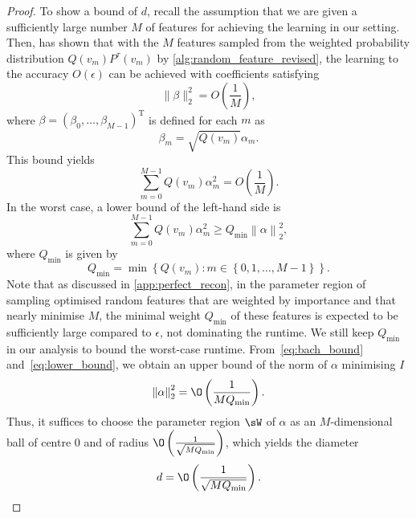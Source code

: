 \begin{proof}
To show a bound of $d$,
recall the assumption that we are given a sufficiently large number $M$ of features for achieving the learning in our setting.
Then, \cite{B1} has shown that
with the $M$ features sampled from the weighted probability distribution $Q(v_m)P^{\tau}(v_m)$ by \cref{alg:random_feature_revised},
the learning to the accuracy $O(\epsilon)$ can be achieved with coefficients satisfying
\begin{equation}
  \|\beta\|_2^2= O\left(\frac{1}{M}\right),
\end{equation}
where $\beta={(\beta_0,\ldots,\beta_{M-1})}^\mathrm{T}$ is defined for each $m$ as
\begin{equation}
  \beta_m=\sqrt{Q(v_m)}\alpha_m.
\end{equation}
This bound yields
\begin{equation}
  \label{eq:bach_bound}
  \sum_{m=0}^{M-1}Q(v_m)\alpha_m^2= O\left(\frac{1}{M}\right).
\end{equation}
In the worst case, a lower bound of the left-hand side is
\begin{equation}
  \label{eq:lower_bound}
  \sum_{m=0}^{M-1}Q(v_m)\alpha_m^2\geq Q_{\min}\left\|\alpha\right\|_2^2,
\end{equation}
where $Q_{\min}$ is given by
\begin{equation}
  Q_{\min}=\min\left\{Q(v_m):m\in\left\{0,1,\ldots,M-1\right\}\right\}.
\end{equation}
Note that as discussed in \cref{app:perfect_recon}, in the parameter region of sampling optimised random features that are weighted by importance and that nearly minimise $M$, the minimal weight $Q_{\min}$ of these features is expected to be sufficiently large compared to $\epsilon$, not dominating the runtime. We still keep $Q_{\min}$ in our analysis to bound the worst-case runtime.
From~\cref{eq:bach_bound} and~\cref{eq:lower_bound}, we obtain an upper bound of the norm of $\alpha$ minimising $I$
\begin{equation}
  \left\|\alpha\right\|_2^2=\O\left(\frac{1}{MQ_{\min}}\right).
\end{equation}
Thus, it suffices to choose the parameter region $\sW$ of $\alpha$ as an $M$-dimensional ball of centre $0$ and of radius $\O\left(\frac{1}{\sqrt{MQ_{\min}}}\right)$, which yields the diameter
\begin{equation}
  \label{eq:bound_d}
  d=\O\left(\frac{1}{\sqrt{MQ_{\min}}}\right).
\end{equation}


\end{proof}
